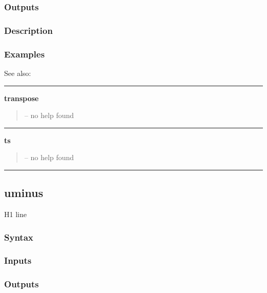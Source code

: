 \documentclass[letterpaper,10pt,english]{sphinxmanual}
\begin{document}
\subsubsection{Outputs}
\label{classes/time_series/@ts/ts:id569}

\subsubsection{Description}
\label{classes/time_series/@ts/ts:id570}

\subsubsection{Examples}
\label{classes/time_series/@ts/ts:id571}
See also:


\bigskip\hrule{}\bigskip

\label{classes/time_series/@ts/ts:transpose}
\textbf{transpose}
\begin{quote}

-- no help found
\end{quote}


\bigskip\hrule{}\bigskip

\label{classes/time_series/@ts/ts:ts}
\textbf{ts}
\begin{quote}

-- no help found
\end{quote}


\bigskip\hrule{}\bigskip



\subsection{uminus}
\label{classes/time_series/@ts/ts:uminus}\label{classes/time_series/@ts/ts:id572}
H1 line


\subsubsection{Syntax}
\label{classes/time_series/@ts/ts:id573}

\subsubsection{Inputs}
\label{classes/time_series/@ts/ts:id574}

\subsubsection{Outputs}
\label{classes/time_series/@ts/ts:id575}
\end{document}
